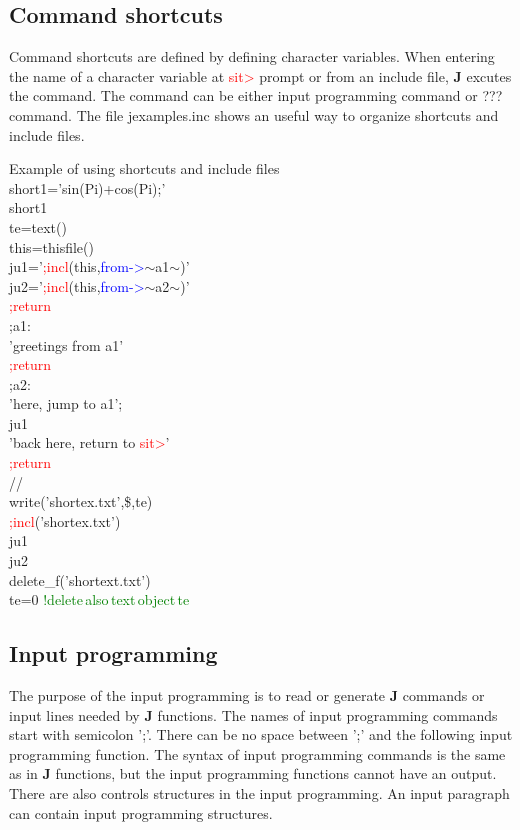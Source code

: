 \subsection{Command shortcuts}
\label{short}
Command shortcuts are defined by defining character variables. When entering the
name of a character variable at \textcolor{Red}{sit>} prompt or from an include file, \textbf{J} excutes the command.
The command can be either input programming command or ??? command. The file jexamples.inc
shows an useful way to organize shortcuts and include files.
\begin{example}[shortex]Example of using shortcuts and include files\\
\label{shortex}
short1='\textcolor{VioletRed}{sin}(Pi)+\textcolor{VioletRed}{cos}(Pi);'\\
short1\\
te=\textcolor{VioletRed}{text}()\\
this=\textcolor{VioletRed}{thisfile}()\\
ju1='\textcolor{Red}{;incl}(this,\textcolor{blue}{from->}$\sim$a1$\sim$)'\\
ju2='\textcolor{Red}{;incl}(this,\textcolor{blue}{from->}$\sim$a2$\sim$)'\\
\textcolor{Red}{;return}\\
;a1:\\
'greetings from a1'\\
\textcolor{Red}{;return}\\
;a2:\\
'here, jump to a1';\\
ju1\\
'back here, return to \textcolor{Red}{sit>}'\\
\textcolor{Red}{;return}\\
//\\
\textcolor{VioletRed}{write}('shortex.txt',\$,te)\\
\textcolor{Red}{;incl}('shortex.txt')\\
ju1\\
ju2\\
delete\_f('shortext.txt')\\
te=0 \textcolor{green}{!delete\,also\,text\,object\,te}
\end{example}
\subsection{Input programming}
\label{inpuprog}
The purpose of the input programming is to read or generate \textbf{J} commands or input lines
needed by \textbf{J} functions. The names of input programming commands start with semicolon ';'.
There can be no space between ';' and the following input programming function. The syntax
of input programming commands is the same as in \textbf{J} functions, but the input programming
functions cannot have an output. There are also controls structures in the input programming.
An input paragraph can contain input programming structures.
